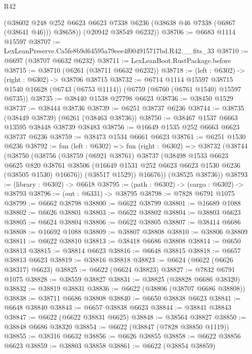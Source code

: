 \begin{lexlean}{R42}
\begin{coremodule}
{        (@38602 @248 @252 @6623 @6623 @7338 @6236 (@38638 @46 @7338 (@6867 (@38641 @46))) @38658))
      (@20942 @38549 @6232))
@38706 := @6683 @1114 @15597
@38707 := LexLeanPreserve.Ca5fe8b9d64595a79eee4f004915717bd.R42.__fits_33
@38710 := @6697 (@38707 @6632 @6232)
@38711 := LexLeanBoot.RustPackage.before
@38715 := @38710 (@6261 (@38711 @6632 @6232))
@38718 := (left : @6302) -> (right : @6302) -> @38706 @38715
@38732 := @6714
    @1114
    @15597
    @38715
    @1540
    @16628
    (@6743 (@6753 @1114))
    (@6759 (@6760 (@6761 @1540) @15597 @6735))
@38735 := @38440 @1538 @27798 @6623
@38736 := @38450 @1529
@38737 := @38444 @38736
@38739 := @6251 @38737 @6236
@38744 := @38735 (@38449 @38739) (@6261 (@38463 @38736))
@38750 := @38467 @1537 @6663 @13595 @38448 @38739 @38483
@38756 := @16649 @1535 @252 @6663 @6623 @38737 @6236
@38759 := @38473 @1534 @6661 @6623
@38761 := @6251 @1530 @6236
@38792 := fun (left : @6302) =>
  fun (right : @6302) =>
  @38732
    (@38744
      (@38750
        (@38756
          (@38759
            (@6921 @38761)
            @38737
            (@38498
              @1533
              @6623
              @6625
              @820
              @38761
              @38506
              (@16649 @1531 @252 @6623 @6623 @1530 @6236 (@38505 @1530) @16676))
            (@38517 @1529))
          @16676))
      (@38525 @38736))
@38793 := (library : @6302) -> @6618
@38795 := (path : @6302) -> (cargo : @6302) -> @38793
@38796 := (out : @6331) -> @38795
@38798 := @7828 @6791 @1075
@38799 := @6662 @38798
@38800 := @6622 @38799
@38801 := @16689 @1088
@38802 := @6626 @38801
@38803 := @6622 @38802
@38804 := @38803 @6623
@38805 := @6624 @38804
@38806 := @6622 @38805
@38807 := @38414 @6686
@38808 := @16692 @1088
@38809 := @38807 @38808
@38810 := @38806 @38809
@38811 := @6622 @38810
@38813 := @38418 @6686 @38808
@38814 := @6650 @38813
@38815 := @38814 @6623
@38816 := @6648 @38815
@38818 := @6657 @38813 @6623
@38819 := @38816 @38818
@38823 := @6624 (@6622 (@6626 @38317) @6623)
@38825 := @6622 (@6624 @38823)
@38827 := @7832 @6791 @1075
@38828 := @38559 @38827
@38831 := @38825 (@38828 @6686 @38320)
@38832 := @38819 @38831
@38836 := @6622 (@38806 (@38707 @6686 @38808))
@38838 := @38711 @6686 @38808
@38840 := @6650 @38838 @6623
@38841 := @6648 @38840
@38843 := @6657 @38838 @6623
@38844 := @38841 @38843
@38847 := @6622 (@6622 @38831 @6625)
@38848 := @38564 @38827
@38850 := @38848 @6686 @38320
@38854 := @6622 (@38847 (@7828 @38850 @1119))
@38855 := @38316 @6632
@38856 := @6626 @38855
@38858 := @6622 @38856 @6623
@38859 := @38803 @38858
@38861 := @6622 (@38854 @38859)
}
\end{coremodule}
\end{lexlean}
